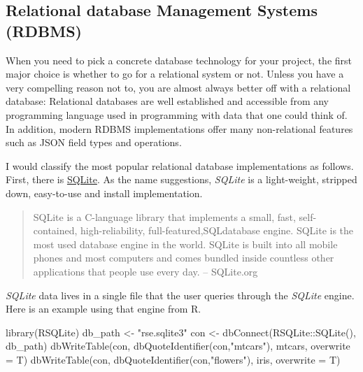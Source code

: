 \documentclass[
  12pt,
  letterpaper,
]{krantz}
\newenvironment{Shaded}{\begin{snugshade}}{\end{snugshade}}
\newcommand{\AttributeTok}[1]{\textcolor[rgb]{0.40,0.45,0.13}{#1}}
\newcommand{\FunctionTok}[1]{\textcolor[rgb]{0.28,0.35,0.67}{#1}}
\newcommand{\NormalTok}[1]{\textcolor[rgb]{0.00,0.23,0.31}{#1}}
\newcommand{\OtherTok}[1]{\textcolor[rgb]{0.00,0.23,0.31}{#1}}
\newcommand{\SpecialCharTok}[1]{\textcolor[rgb]{0.37,0.37,0.37}{#1}}
\newcommand{\StringTok}[1]{\textcolor[rgb]{0.13,0.47,0.30}{#1}}
\begin{document}
\hypertarget{relational-database-management-systems-rdbms}{%
\subsection{\texorpdfstring{Relational database
Management Systems
(RDBMS)}{Relational database Management Systems (RDBMS)}}\label{relational-database-management-systems-rdbms}}

When you need to pick a concrete database technology for
your project, the first major choice is whether to go for a relational
system or not. Unless you have a very compelling reason not to, you are
almost always better off with a relational database:
Relational databases are well established and accessible
from any programming language used in programming with data that one
could think of. In addition, modern RDBMS implementations offer many
non-relational features such as JSON field types and operations.

I would classify the most popular relational database
implementations as follows. First, there is
\href{https://www.sqlite.org/index.html}{SQLite}. As the name
suggestions, \emph{SQLite} is a light-weight, stripped down, easy-to-use
and install implementation.

\begin{quote}
SQLite is a C-language library that implements a small,
fast, self-contained, high-reliability,
full-featured,SQLdatabase engine. SQLite is
the most used database engine in the world. SQLite is
built into all mobile phones and most computers and comes bundled inside
countless other applications that people use every day. -- SQLite.org
\end{quote}

\emph{SQLite} data lives in a single file that the user queries through
the \emph{SQLite} engine. Here is an example using that
engine from R.

\normalsize

\begin{Shaded}
\begin{Highlighting}[]
\FunctionTok{library}\NormalTok{(RSQLite)}
\NormalTok{db\_path }\OtherTok{\textless{}{-}} \StringTok{"rse.sqlite3"}
\NormalTok{con }\OtherTok{\textless{}{-}} \FunctionTok{dbConnect}\NormalTok{(RSQLite}\SpecialCharTok{::}\FunctionTok{SQLite}\NormalTok{(), db\_path)}
\FunctionTok{dbWriteTable}\NormalTok{(con, }\FunctionTok{dbQuoteIdentifier}\NormalTok{(con,}\StringTok{"mtcars"}\NormalTok{),}
\NormalTok{             mtcars, }\AttributeTok{overwrite =}\NormalTok{ T)}
\FunctionTok{dbWriteTable}\NormalTok{(con, }\FunctionTok{dbQuoteIdentifier}\NormalTok{(con,}\StringTok{"flowers"}\NormalTok{),}
\NormalTok{             iris, }\AttributeTok{overwrite =}\NormalTok{ T)}
\end{Highlighting}
\end{Shaded}
\end{document}
